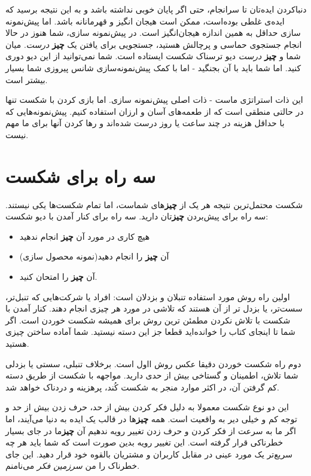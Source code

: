دنباکردن ایده‌تان تا سرانجام، حتی اگر پایان خوبی نداشته باشد و به این
نتیجه برسید که ایده‌ی غلطی بوده‌است، ممکن است هیجان انگیز و قهرمانانه
باشد. اما پیش‌نمونه سازی حداقل به همین اندازه هیجان‌انگیز است. در
پیش‌نمونه سازی، شما هنوز در حالا انجام جستجوی حماسی و پرچالش هستید،
جستجویی برای یافتن یک \textbf{چیز} \emph{درست}. میان شما و \textbf{چیز}
\emph{درست} دیو ترسناک شکست ایستاده است. شما نمی‌توانید از این دیو دوری
کنید. اما شما باید با آن بجنگید - اما با کمک پیش‌نمونه‌سازی شانس پیروزی
شما بسیار بیشتر است.

این ذات استراتژی ماست - ذات اصلی پیش‌نمونه سازی. اما بازی کردن با شکست
تنها در حالتی منطقی است که از طعمه‌های آسان و ارزان استفاده کنیم.
پیش‌نمونه‌هایی که با حداقل هزینه در چند ساعت یا روز درست شده‌اند و رها
کردن آنها برای ما مهم نیست.

\section{سه راه برای
شکست}\label{ux633ux647-ux631ux627ux647-ux628ux631ux627ux6cc-ux634ux6a9ux633ux62a}

شکست محتمل‌ترین نتیجه هر یک از \textbf{چیز}های شماست، اما تمام شکست‌ها
یکی نیستند. سه راه برای پیش‌بردن \textbf{چیز}تان دارید. سه راه برای کنار
آمدن با دیو شکست:

\begin{itemize}

\item
  هیچ کاری در مورد آن \textbf{چیز} انجام ندهید
\item
  آن \textbf{چیز} را انجام دهید(نمونه محصول سازی)
\item
  آن \textbf{چیز} را امتحان کنید.
\end{itemize}

اولین راه روش مورد استفاده تنبلان و بزدلان است: افراد یا شرکت‌هایی که
تنبل‌تر، سست‌تر، یا بزدل تر از آن هستند که تلاشی در مورد هر چیزی انجام
دهند. کنار آمدن با شکست با تلاش نکردن مطمئن ترین روش برای همیشه شکست
خوردن است. اگر شما تا اینجای کتاب را خوانده‌اید قطعا جز این دسته نیستید.
شما آماده ساختن چیزی هستید.

دوم راه شکست خوردن دقیقا عکس روش ااول است. برخلاف تنبلی، سستی یا بزدلی
شما تلاش، اطمینان و گستاخی بیش از حدی دارید. مواجهه با شکست از طریق دسته
کم گرفتن آن، در اکثر موارد منجر به شکست کُند، پرهزینه و دردناک خواهد شد.

این دو نوع شکست معمولا به دلیل فکر کردن بیش از حد، حرف زدن بیش از حد و
توجه کم و خیلی دیر به واقعیت است. همه \textbf{چیز}ها در قالب یک ایده به
دنیا می‌آیند، اما اگر ما به سرعت از فکر کردن و حرف زدن تغییر رویه ندهیم
آن \textbf{چیز}ما در جای بسیار خطرناکی قرار گرفته است. این تغییر رویه
بدین صورت است که شما باید هر چه سریع‌تر یک مورد عینی در مقابل کاربران و
مشتریان بالقوه خود قرار دهید. این جای خطرناک را من \emph{سرزمین فکر}
می‌نامنم.

